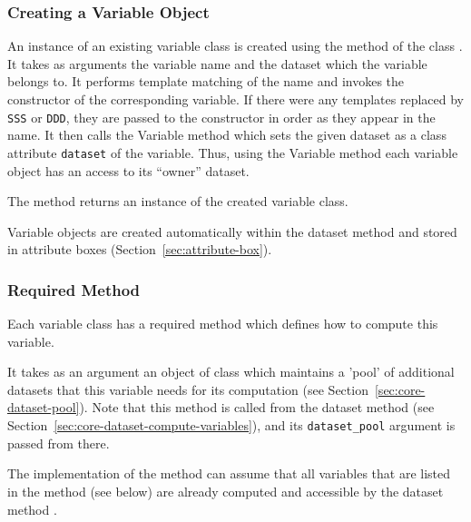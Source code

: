 \subsubsection{Creating a Variable Object}
%
An instance of an existing variable class is
created using the method
 of the
class .  It takes as arguments
the variable name and the dataset which the variable belongs to. It performs
template matching of the name and invokes the constructor of the corresponding
variable. If there were any templates replaced by \verb|SSS| or \verb|DDD|,
they are passed to the constructor in order as they appear in the name. It
then calls the Variable method  which sets the given
dataset as a class attribute \verb|dataset| of the variable. Thus, using the
Variable method  each variable object has an access to
its ``owner'' dataset. 

The  method  returns an instance
of the created variable class.

Variable objects are created automatically within the dataset method
 and stored in attribute boxes
(Section~\ref{sec:attribute-box}).

\subsubsection{Required Method }
%
Each variable class has a required method  which defines how
to compute this variable.

It takes as an argument an object of class  which
maintains a 'pool' of additional datasets that this variable needs for its computation 
(see Section~\ref{sec:core-dataset-pool}). Note that this method is called from the
dataset method  (see Section~\ref{sec:core-dataset-compute-variables}), 
and its \verb|dataset_pool| argument is passed from there. 

The implementation of the  method can assume that all
variables that are listed in the
 method (see below) are already computed and accessible by the dataset 
method .

